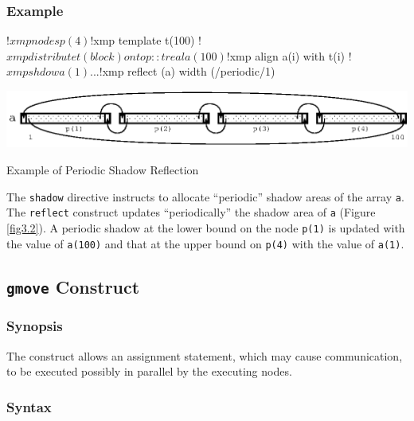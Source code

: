 \subsubsection*{Example}

\begin{Fexample}
!$xmp nodes p(4)
!$xmp template t(100)
!$xmp distribute t(block) onto p:: t

      real a(100)
!$xmp align a(i) with t(i)
!$xmp shdow a(1)

      ...
!$xmp reflect (a) width (/periodic/1)
\end{Fexample}

\begin{myfigure}
\begin{center}
\includegraphics[width=0.7\hsize]{figs/fig3.2.eps}
\end{center}
\caption{Example of Periodic Shadow Reflection}
\label{fig3.2}
\end{myfigure}

The {\tt shadow} directive instructs to allocate ``periodic'' shadow
areas of the array {\tt a}.
The {\tt reflect} construct updates ``periodically'' the shadow area of
{\tt a} (Figure \ref{fig3.2}). A periodic shadow at the lower
bound on the node {\tt p(1)} is updated with the value of {\tt a(100)}
and that at the upper bound on {\tt p(4)} with the value of {\tt a(1)}.


\subsection{{\tt gmove} Construct}

\subsubsection*{Synopsis}


The {\tt {}} construct allows an assignment statement,
which may cause communication, to be executed possibly in parallel by
the executing nodes.

\subsubsection*{Syntax}


